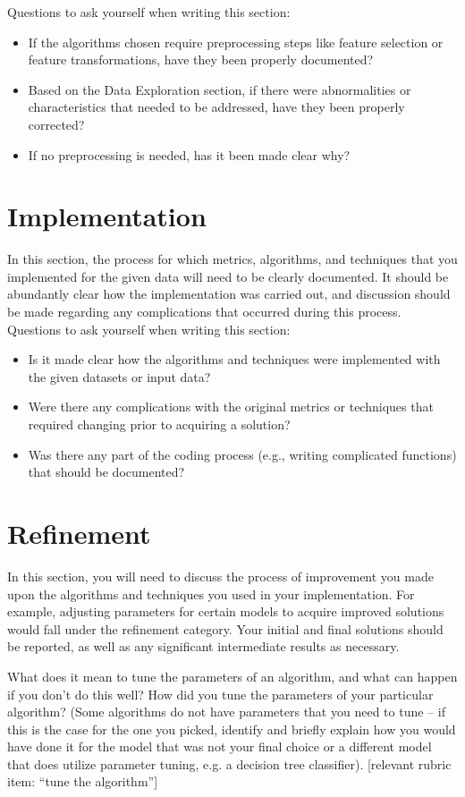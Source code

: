 \documentclass[twoside,openright,titlepage,numbers=noenddot,headinclude,%
               footinclude=true,cleardoublepage=empty,abstractoff,BCOR=5mm,%
               paper=a4,fontsize=11pt,ngerman,american]{scrreprt}
\numberwithin{theorem}{chapter}
\numberwithin{definition}{chapter}
\numberwithin{algorithm}{chapter}
\numberwithin{figure}{chapter}
\numberwithin{table}{chapter}
\numberwithin{equation}{chapter}
\begin{document}
Questions to ask yourself when writing this section:
\begin{itemize}%
\item If the algorithms chosen require preprocessing steps like feature selection or feature transformations, have they been properly documented?
\item Based on the Data Exploration section, if there were abnormalities or characteristics that needed to be addressed, have they been properly corrected?
\item If no preprocessing is needed, has it been made clear why?
\end{itemize}


\section*{Implementation}
In this section, the process for which metrics, algorithms, and techniques that you implemented for the given data will need to be clearly documented. It should be abundantly clear how the implementation was carried out, and discussion should be made regarding any complications that occurred during this process. Questions to ask yourself when writing this section:
\begin{itemize}%
\item Is it made clear how the algorithms and techniques were implemented with the given datasets or input data?
\item Were there any complications with the original metrics or techniques that required changing prior to acquiring a solution?
\item Was there any part of the coding process (e.g., writing complicated functions) that should be documented?
\end{itemize}


\section*{Refinement}
In this section, you will need to discuss the process of improvement you made upon the algorithms and techniques you used in your implementation. For example, adjusting parameters for certain models to acquire improved solutions would fall under the refinement category. Your initial and final solutions should be reported, as well as any significant intermediate results as necessary. 

What does it mean to tune the parameters of an algorithm, and what can happen if you don't do this well?  How did you tune the parameters of your particular algorithm? (Some algorithms do not have parameters that you need to tune -- if this is the case for the one you picked, identify and briefly explain how you would have done it for the model that was not your final choice or a different model that does utilize parameter tuning, e.g. a decision tree classifier).  [relevant rubric item: ``tune the algorithm'']
\end{document}
